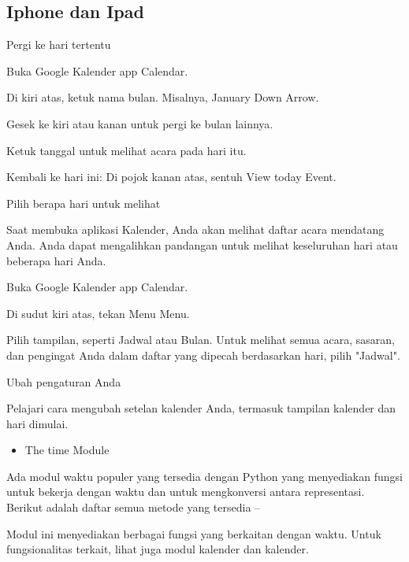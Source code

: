 \noindent 
 \subsection { Iphone dan Ipad }
\noindent 
Pergi ke hari tertentu \par
\noindent 
Buka Google Kalender app Calendar. \par
\noindent 
Di kiri atas, ketuk nama bulan. Misalnya, January Down Arrow. \par
\noindent 
Gesek ke kiri atau kanan untuk pergi ke bulan lainnya. \par
\noindent 
Ketuk tanggal untuk melihat acara pada hari itu. \par
\noindent 
Kembali ke hari ini: Di pojok kanan atas, sentuh View today Event. \par
\vspace{12pt}
\noindent 
Pilih berapa hari untuk melihat \par
\noindent 
Saat membuka aplikasi Kalender, Anda akan melihat daftar acara mendatang Anda. Anda dapat mengalihkan pandangan untuk melihat keseluruhan hari atau beberapa hari Anda. \par
\vspace{12pt}
\noindent 
Buka Google Kalender app Calendar. \par
\noindent 
Di sudut kiri atas, tekan Menu Menu. \par
\noindent 
Pilih tampilan, seperti Jadwal atau Bulan. Untuk melihat semua acara, sasaran, dan pengingat Anda dalam daftar yang dipecah berdasarkan hari, pilih "Jadwal". \par
\noindent 
Ubah pengaturan Anda \par
\noindent 
Pelajari cara mengubah setelan kalender Anda, termasuk tampilan kalender dan hari dimulai. \par
\vspace{\baselineskip}
\noindent 
\begin{itemize}
\item The time Module
\end{itemize}
\noindent 
 \hspace*{0.5in} Ada modul waktu populer yang tersedia dengan Python yang menyediakan fungsi untuk bekerja dengan waktu dan untuk mengkonversi antara representasi. Berikut adalah daftar semua metode yang tersedia – \par
\noindent 
Modul ini menyediakan berbagai fungsi yang berkaitan dengan waktu. Untuk fungsionalitas terkait, lihat juga modul kalender dan kalender. \par
